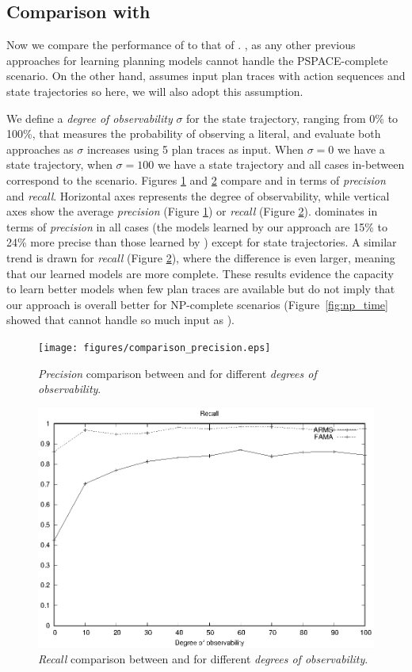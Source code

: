 \subsection{Comparison with \ARMS}
Now we compare the performance of \FAMA to that of \ARMS. \ARMS, as any other previous approaches for learning planning models cannot handle the PSPACE-complete scenario. On the other hand, \ARMS assumes input plan traces with \FO action sequences and \NO state trajectories so here, we will also adopt this assumption.

We define a \emph{degree of observability} $\sigma$ for the state trajectory, ranging from 0\% to 100\%, that measures the probability of observing a literal, and evaluate both approaches as $\sigma$ increases using 5 plan traces as input. When $\sigma = 0$ we have a \NO state trajectory, when $\sigma=100$ we have a \FO state trajectory and all cases in-between correspond to the \PO scenario. Figures \ref{fig:comparison_precision} and \ref{fig:comparison_recall} compare \FAMA and \ARMS in terms of {\em precision} and {\em recall}. Horizontal axes represents the degree of observability, while vertical axes show the average {\em precision} (Figure \ref{fig:comparison_precision}) or {\em recall} (Figure \ref{fig:comparison_recall}). \FAMA dominates in terms of {\em precision} in all cases (the models learned by our approach are 15\% to 24\% more precise than those learned by \ARMS) except for \FO state trajectories. A similar trend is drawn for {\em recall} (Figure \ref{fig:comparison_recall}), where the difference is even larger, meaning that our learned models are more complete. These results evidence the \FAMA capacity to learn better models when few plan traces are available but do not imply that our approach is overall better for NP-complete scenarios (Figure~\ref{fig:np_time} showed that \FAMA cannot handle so much input as \ARMS).



\begin{figure}[hbt!]
	\centering
	\texttt{[image: figures/comparison\_precision.eps]}
	\caption{{\em Precision} comparison between \FAMA and \ARMS for different \emph{degrees of observability}.}
	\label{fig:comparison_precision}
\end{figure}

\begin{figure}[hbt!]
	\centering
	\includegraphics[width=.65\linewidth]{figures/comparison_recall.eps}
	\caption{{\em Recall} comparison between \FAMA and \ARMS for different \emph{degrees of observability}.}
	\label{fig:comparison_recall}
\end{figure}



